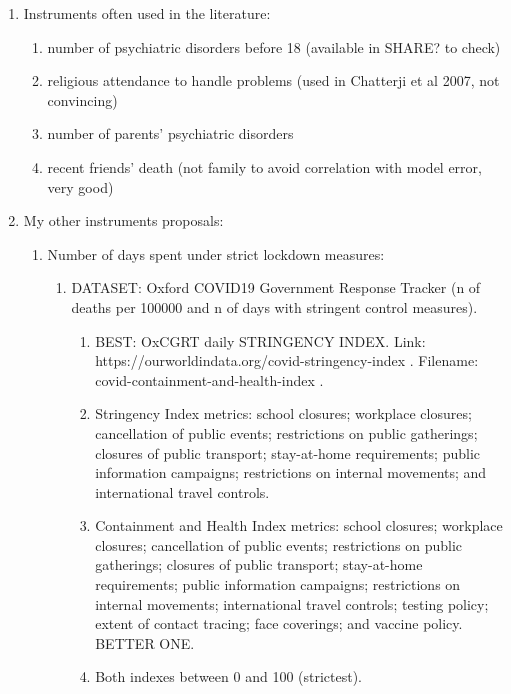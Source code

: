 \documentclass{article}
\begin{document}
\begin{enumerate}
    \item Instruments often used in the literature:
        \begin{enumerate}
            \item number of psychiatric disorders before 18 (available in SHARE? to check)
            \item religious attendance to handle problems (used in Chatterji et al 2007, not convincing)
            \item number of parents' psychiatric disorders 
            \item recent friends' death (not family to avoid correlation with model error, very good)
        \end{enumerate}

    \item My other instruments proposals:
        \begin{enumerate}
            \item Number of days spent under strict lockdown measures:
                \begin{enumerate}
                    \item DATASET: Oxford COVID19 Government Response Tracker (n of deaths per 100000 and n of days with stringent control measures). 
                    \begin{enumerate}
                        \item BEST: OxCGRT daily STRINGENCY INDEX. \newline Link: https://ourworldindata.org/covid-stringency-index . Filename: covid-containment-and-health-index .
                        \item Stringency Index metrics: school closures; workplace closures; cancellation of public events; restrictions on public gatherings; closures of public transport; stay-at-home requirements; public information campaigns; restrictions on internal movements; and international travel controls.
                        \item Containment and Health Index metrics: school closures; workplace closures; cancellation of public events; restrictions on public gatherings; closures of public transport; stay-at-home requirements; public information campaigns; restrictions on internal movements; international travel controls; testing policy; extent of contact tracing; face coverings; and vaccine policy. BETTER ONE.
                        \item Both indexes between 0 and 100 (strictest).

\end{enumerate}
\end{enumerate}
\end{enumerate}
\end{enumerate}
\end{document}
